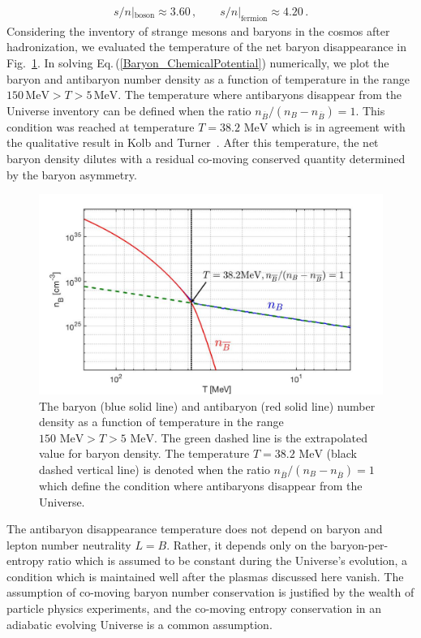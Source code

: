 \documentclass[universe,article,submit,moreauthors,pdftex,a4paper]{Definitions/mdpi}
\newcommand{\MeV}{\text{ MeV}}
\newcommand{\req}[1]{Eq.\,(\ref{#1})}
\newcommand*{\rf}[1]{Fig.~{\ref{#1}}}
\begin{document}
\begin{align}
s/n|_\mathrm{boson}\approx 3.60\,,\qquad
s/n|_\mathrm{fermion}\approx 4.20\,.
\end{align}
Considering the inventory of strange mesons and baryons in the cosmos after hadronization, we evaluated the temperature of the net baryon disappearance in \rf{Baryon_fig}. In solving \req{Baryon_ChemicalPotential} numerically, we plot the baryon and antibaryon number density as a function of temperature in the range $150\,\mathrm{MeV}>T>5\,\mathrm{MeV}$. The temperature where antibaryons disappear from the Universe inventory can be defined when the ratio $n_{\overline B}/(n_B-n_{\overline B})=1$. This condition was reached at temperature $T=38.2\MeV$ which is in agreement with the qualitative result in Kolb and Turner~\cite{kolb1990early}. After this temperature, the net baryon density dilutes with a residual co-moving conserved quantity determined by the baryon asymmetry.

\begin{figure}[ht]
\centering
\includegraphics[width=\textwidth]{./plots/Baryon_Antibaryon_cm.jpg}
\caption{The baryon (blue solid line) and antibaryon (red solid line) number density as a function of temperature in the range $150\MeV>T>5\MeV$. The green dashed line is the extrapolated value for baryon density. The temperature $T=38.2\MeV$ (black dashed vertical line) is denoted when the ratio $n_{\overline B}/(n_B-n_{\overline B})=1$ which define the condition where antibaryons disappear from the Universe.}
\label{Baryon_fig}
\end{figure}

The antibaryon disappearance temperature does not depend on baryon and lepton number neutrality $L=B$. Rather, it depends only on the baryon-per-entropy ratio which is assumed to be constant during the Universe's evolution, a condition which is maintained well after the plasmas discussed here vanish. The assumption of co-moving baryon number conservation is justified by the wealth of particle physics experiments, and the co-moving entropy conservation in an adiabatic evolving Universe is a common assumption.
\end{document}
